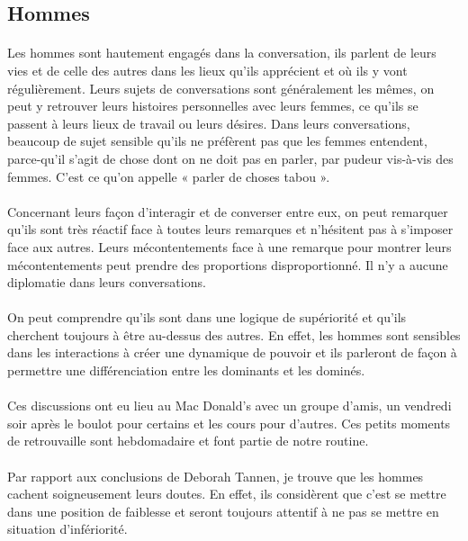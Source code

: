\subsection{Hommes}
\paragraph{}
Les hommes sont hautement engagés dans la conversation, ils parlent de leurs vies et de celle des autres dans
les lieux qu’ils apprécient et où ils y vont régulièrement. Leurs sujets de conversations sont généralement les
mêmes, on peut y retrouver leurs histoires personnelles avec leurs femmes, ce qu’ils se passent à leurs lieux
de travail ou leurs désires. Dans leurs conversations, beaucoup de sujet sensible qu'ils ne préfèrent pas que
les femmes entendent, parce-qu'il s'agit de chose dont on ne doit pas en parler, par pudeur vis-à-vis des
femmes. C'est ce qu'on appelle « parler de choses tabou ».

\paragraph{}
Concernant leurs façon d’interagir et de converser entre eux, on peut remarquer qu'ils sont très réactif face à
toutes leurs remarques et n’hésitent pas à s’imposer face aux autres. Leurs mécontentements face à une
remarque pour montrer leurs mécontentements peut prendre des proportions disproportionné. Il n'y a aucune
diplomatie dans leurs conversations.

\paragraph{}
On peut comprendre qu'ils sont dans une logique de supériorité et qu'ils cherchent toujours à être au-dessus
des autres. En effet, les hommes sont sensibles dans les interactions à créer une dynamique de pouvoir et ils
parleront de façon à permettre une différenciation entre les dominants et les dominés.

\paragraph{}
Ces discussions ont eu lieu au Mac Donald's avec un groupe d'amis, un vendredi soir après le boulot pour
certains et les cours pour d'autres. Ces petits moments de retrouvaille sont hebdomadaire et font partie de
notre routine.

\paragraph{}
Par rapport aux conclusions de Deborah Tannen, je trouve que les hommes cachent soigneusement leurs
doutes. En effet, ils considèrent que c'est se mettre dans une position de faiblesse et seront toujours attentif à
ne pas se mettre en situation d'infériorité.

